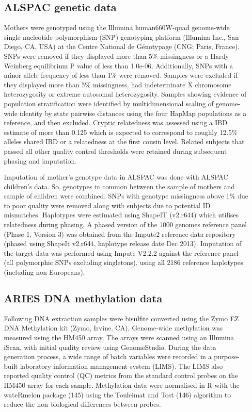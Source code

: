 \documentclass[11pt,twoside]{bristolthesis}
\begin{document}
\hypertarget{alspac-genetic-data}{%
\subsection{ALSPAC genetic data}\label{alspac-genetic-data}}

Mothers were genotyped using the Illumina human660W-quad genome-wide single nucleotide polymorphism (SNP) genotyping platform (Illumina Inc., San Diego, CA, USA) at the Centre National de Génotypage (CNG; Paris, France). SNPs were removed if they displayed more than 5\% missingness or a Hardy-Weinberg equilibrium P value of less than 1.0e-06. Additionally, SNPs with a minor allele frequency of less than 1\% were removed. Samples were excluded if they displayed more than 5\% missingness, had indeterminate X chromosome heterozygosity or extreme autosomal heterozygosity. Samples showing evidence of population stratification were identified by multidimensional scaling of genome-wide identity by state pairwise distances using the four HapMap populations as a reference, and then excluded. Cryptic relatedness was assessed using a IBD estimate of more than 0.125 which is expected to correspond to roughly 12.5\% alleles shared IBD or a relatedness at the first cousin level. Related subjects that passed all other quality control thresholds were retained during subsequent phasing and imputation.

Imputation of mother's genotype data in ALSPAC was done with ALSPAC children's data. So, genotypes in common between the sample of mothers and sample of children were combined. SNPs with genotype missingness above 1\% due to poor quality were removed along with subjects due to potential ID mismatches. Haplotypes were estimated using ShapeIT (v2.r644) which utilises relatedness during phasing. A phased version of the 1000 genomes reference panel (Phase 1, Version 3) was obtained from the Impute2 reference data repository (phased using ShapeIt v2.r644, haplotype release date Dec 2013). Imputation of the target data was performed using Impute V2.2.2 against the reference panel (all polymorphic SNPs excluding singletons), using all 2186 reference haplotypes (including non-Europeans).

\hypertarget{aries-dnam-data}{%
\subsection{ARIES DNA methylation data}\label{aries-dnam-data}}

Following DNA extraction samples were bisulfite converted using the Zymo EZ DNA Methylation kit (Zymo, Irvine, CA). Genome-wide methylation was measured using the HM450 array. The arrays were scanned using an Illumina iScan, with initial quality review using GenomeStudio. During the data generation process, a wide range of batch variables were recorded in a purpose-built laboratory information management system (LIMS). The LIMS also reported quality control (QC) metrics from the standard control probes on the HM450 array for each sample. Methylation data were normalised in R with the wateRmelon package (145) using the Touleimat and Tost (146) algorithm to reduce the non-biological differences between probes.
\end{document}

